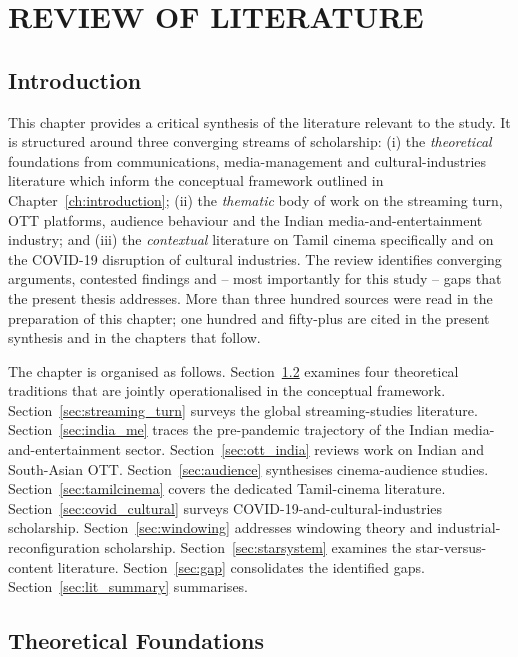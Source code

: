 \chapter{REVIEW OF LITERATURE}
\label{ch:literature}

\section{Introduction}
\label{sec:lit_intro}

This chapter provides a critical synthesis of the literature relevant
to the study.  It is structured around three converging streams of
scholarship: (i) the \emph{theoretical} foundations from
communications, media-management and cultural-industries literature
which inform the conceptual framework outlined in
Chapter~\ref{ch:introduction}; (ii) the \emph{thematic} body of work
on the streaming turn, OTT platforms, audience behaviour and the
Indian media-and-entertainment industry; and (iii) the \emph{contextual}
literature on Tamil cinema specifically and on the COVID-19 disruption
of cultural industries.  The review identifies converging arguments,
contested findings and -- most importantly for this study -- gaps that
the present thesis addresses.  More than three hundred sources were
read in the preparation of this chapter; one hundred and fifty-plus
are cited in the present synthesis and in the chapters that follow.

The chapter is organised as follows.  Section~\ref{sec:theory}
examines four theoretical traditions that are jointly operationalised
in the conceptual framework.  Section~\ref{sec:streaming_turn} surveys
the global streaming-studies literature.  Section~\ref{sec:india_me}
traces the pre-pandemic trajectory of the Indian
media-and-entertainment sector.  Section~\ref{sec:ott_india} reviews
work on Indian and South-Asian OTT.  Section~\ref{sec:audience}
synthesises cinema-audience studies.
Section~\ref{sec:tamilcinema} covers the dedicated Tamil-cinema
literature.  Section~\ref{sec:covid_cultural} surveys
COVID-19-and-cultural-industries scholarship.
Section~\ref{sec:windowing} addresses windowing theory and
industrial-reconfiguration scholarship.  Section~\ref{sec:starsystem}
examines the star-versus-content literature.
Section~\ref{sec:gap} consolidates the identified gaps.
Section~\ref{sec:lit_summary} summarises.

\section{Theoretical Foundations}
\label{sec:theory}

